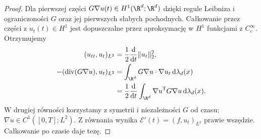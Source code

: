 \begin{proof}
Dla pierwszej części $G\nabla u(t)\in H^1(\R^d;\R^d)$
dzięki regule Leibniza i ograniczoności $G$ oraz
jej pierwszych słabych pochodnych.
Całkowanie przez części z $u_t(t)\in H^1$
jest dopuszczalne przez aproksymację w $H^1$
funkcjami z $C_c^\infty$. Otrzymujemy
\[
 \begin{split}
 (u_{tt},u_t)_{L^2}
 &=\frac12\frac{\mathrm d}{\mathrm dt}\|u_t\|_2^2,\\
 -(\operatorname{div}(G\nabla u),u_t)_{L^2}
 &=\int_{\R^d}G\nabla u\cdot\nabla u_t\,\mathrm d\lambda_d(x)\\
 &=\frac12\frac{\mathrm d}{\mathrm dt}
 \int_{\R^d}\nabla u^\mathsf TG\nabla u\,\mathrm d\lambda_d(x).
 \end{split}
\]
W drugiej równości korzystamy z symetrii i niezależności
$G$ od czasu; $\nabla u\in C^1([0,T];L^2)$.
Z równania wynika $\mathcal E'(t)=(f,u_t)_{L^2}$
prawie wszędzie. Całkowanie po czasie daje tezę.


\end{proof}
